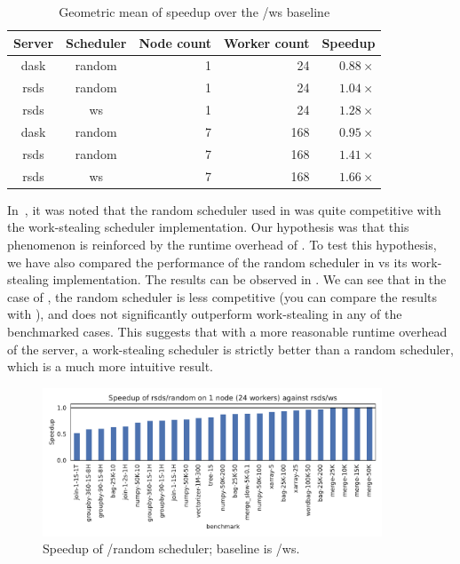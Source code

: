 \setlength{\tabcolsep}{5pt}
\begin{table}
	\caption{Geometric mean of speedup over the \dask{}/ws baseline}
	\centering
	\label{tab:rsds-geom-mean-speedup}
	\begin{tabular}{c|c|r|r|r}
		\textbf{Server} & \textbf{Scheduler} & \textbf{Node count} & \textbf{Worker	count} &
		\textbf{Speedup}                                                                                 \\
		\midrule
		dask            & random             & 1                   & 24                   & $0.88\times$ \\
		rsds            & random             & 1                   & 24                   & $1.04\times$ \\
		rsds            & ws                 & 1                   & 24                   & $1.28\times$ \\
		dask            & random             & 7                   & 168                  & $0.95\times$ \\
		rsds            & random             & 7                   & 168                  & $1.41\times$ \\
		rsds            & ws                 & 7                   & 168                  & $1.66\times$ \\
	\end{tabular}
\end{table}

In~, it was noted that the random scheduler used in
\dask{} was quite competitive with the work-stealing scheduler implementation.
Our hypothesis was that this phenomenon is reinforced by the runtime overhead of
\dask{}. To test this hypothesis, we have also compared the performance of the
random scheduler in \rsds{} vs its work-stealing implementation. The results
can be observed in . We can see that in the case of
\rsds{}, the random scheduler is less competitive (you can compare the results
with ), and does not significantly outperform work-stealing in any of
the benchmarked cases. This suggests that with a more reasonable runtime overhead of the server, a
work-stealing scheduler is strictly better than a random scheduler, which is a much more intuitive
result.

\begin{figure}
	\centering
	\includegraphics[width=0.9\textwidth]{./imgs/rsds/charts/speedup-rsds-random-1-baseline-rsds-ws}
	\caption{Speedup of \rsds{}/random scheduler; baseline is \rsds{}/ws.}
	\label{fig:rsds-random-baseline}
\end{figure}


